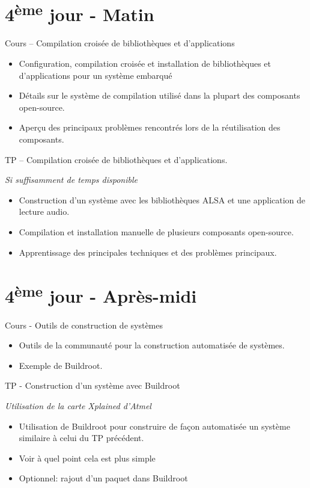 \documentclass[a4paper,12pt,obeyspaces,spaces,hyphens]{article}
\begin{document}
\section{4\textsuperscript{ème} jour - Matin}

\feagendatwocolumn
{Cours – Compilation croisée de bibliothèques et d'applications}
{
  \begin{itemize}
  \item Configuration, compilation croisée et installation de bibliothèques
	et d'applications pour un système embarqué
  \item Détails sur le système de compilation utilisé dans la plupart
	des composants open-source.
  \item Aperçu des principaux problèmes rencontrés lors de la
	réutilisation des composants.
  \end{itemize}
}
{TP – Compilation croisée de bibliothèques et d'applications.}
{
  {\em Si suffisamment de temps disponible}
  \begin{itemize}
  \item Construction d'un système avec les bibliothèques ALSA et une
	application de lecture audio.
  \item Compilation et installation manuelle de plusieurs
	composants open-source.
  \item Apprentissage des principales techniques et des problèmes principaux.
  \end{itemize}
}

\section{4\textsuperscript{ème} jour - Après-midi}

\feagendatwocolumn
{Cours - Outils de construction de systèmes}
{
  \begin{itemize}
  \item Outils de la communauté pour la construction
	automatisée de systèmes.
  \item Exemple de Buildroot.
  \end{itemize}
}
{TP - Construction d'un système avec Buildroot}
{
  {\em Utilisation de la carte Xplained d'Atmel}
  \begin{itemize}
  \item Utilisation de Buildroot pour construire de façon automatisée
	un système similaire à celui du TP précédent.
  \item Voir à quel point cela est plus simple
  \item Optionnel: rajout d'un paquet dans Buildroot
  \end{itemize}
}
\end{document}
